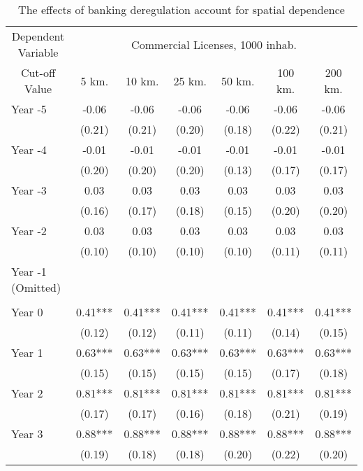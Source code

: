 \begin{table}[H]

\caption{\label{tab:appConley}The effects of banking deregulation account for spatial dependence}
\centering
\begin{tabular}[t]{lcccccc}
\toprule
\multicolumn{1}{c}{Dependent Variable} & \multicolumn{6}{c}{Commercial Licenses, 1000 inhab.} \\
\cmidrule(l{3pt}r{3pt}){1-1} \cmidrule(l{3pt}r{3pt}){2-7}
\multicolumn{1}{c}{Cut-off Value} & \multicolumn{1}{c}{5 km.} & \multicolumn{1}{c}{10 km.} & \multicolumn{1}{c}{25 km.} & \multicolumn{1}{c}{50 km.} & \multicolumn{1}{c}{100 km.} & \multicolumn{1}{c}{200 km.} \\
\cmidrule(l{3pt}r{3pt}){1-1} \cmidrule(l{3pt}r{3pt}){2-2} \cmidrule(l{3pt}r{3pt}){3-3} \cmidrule(l{3pt}r{3pt}){4-4} \cmidrule(l{3pt}r{3pt}){5-5} \cmidrule(l{3pt}r{3pt}){6-6} \cmidrule(l{3pt}r{3pt}){7-7}
Year -5 & -0.06 & -0.06 & -0.06 & -0.06 & -0.06 & -0.06\\
 & (0.21) & (0.21) & (0.20) & (0.18) & (0.22) & (0.21)\\
Year -4 & -0.01 & -0.01 & -0.01 & -0.01 & -0.01 & -0.01\\
 & (0.20) & (0.20) & (0.20) & (0.13) & (0.17) & (0.17)\\
Year -3 & 0.03 & 0.03 & 0.03 & 0.03 & 0.03 & 0.03\\
 & (0.16) & (0.17) & (0.18) & (0.15) & (0.20) & (0.20)\\
Year -2 & 0.03 & 0.03 & 0.03 & 0.03 & 0.03 & 0.03\\
 & (0.10) & (0.10) & (0.10) & (0.10) & (0.11) & (0.11)\\
Year -1 (Omitted) &  &  &  &  &  & \\
 &  &  &  &  &  & \\
Year 0 & 0.41*** & 0.41*** & 0.41*** & 0.41*** & 0.41*** & 0.41***\\
 & (0.12) & (0.12) & (0.11) & (0.11) & (0.14) & (0.15)\\
Year 1 & 0.63*** & 0.63*** & 0.63*** & 0.63*** & 0.63*** & 0.63***\\
 & (0.15) & (0.15) & (0.15) & (0.15) & (0.17) & (0.18)\\
Year 2 & 0.81*** & 0.81*** & 0.81*** & 0.81*** & 0.81*** & 0.81***\\
 & (0.17) & (0.17) & (0.16) & (0.18) & (0.21) & (0.19)\\
Year 3 & 0.88*** & 0.88*** & 0.88*** & 0.88*** & 0.88*** & 0.88***\\
 & (0.19) & (0.18) & (0.18) & (0.20) & (0.22) & (0.20)\\

\end{tabular}
\end{table}
